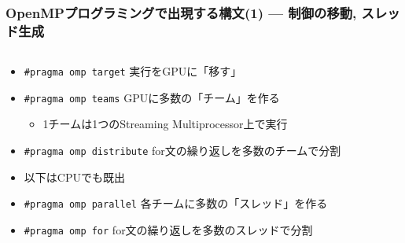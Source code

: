 \documentclass[10pt,dvipdfmx]{beamer}
\newcommand{\ao}[1]{{\color{blue}#1}}
\begin{document}
\begin{frame}
  \frametitle{OpenMPプログラミングで出現する構文(1) --- 制御の移動, スレッド生成}
  \begin{columns}
    \begin{column}{0.45\textwidth}
      \begin{itemize}
      \item<2-> \ao{\tt \#pragma omp target} 実行をGPUに「移す」
      \item<3-> \ao{\tt \#pragma omp teams} GPUに多数の「チーム」を作る
        \begin{itemize}
        \item 1チームは1つのStreaming Multiprocessor上で実行
        \end{itemize}
      \item<3-> \ao{\tt \#pragma omp distribute} for文の繰り返しを多数のチームで分割
      \item<4-> 以下はCPUでも既出
      \item<4-> {\tt \#pragma omp parallel} 各チームに多数の「スレッド」を作る
      \item<4-> {\tt \#pragma omp for} for文の繰り返しを多数のスレッドで分割
      \end{itemize}
    \end{column}
    \begin{column}{0.6\textwidth}
    \end{column}
  \end{columns}
\end{frame}
\end{document}
